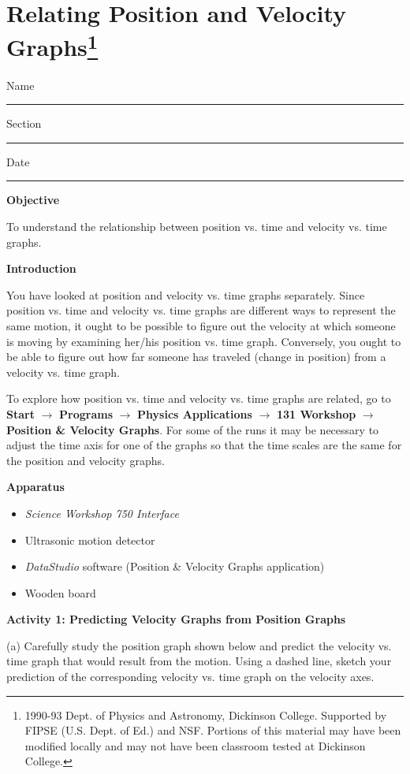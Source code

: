 
\section{Relating Position and Velocity Graphs\footnote{
1990-93 Dept. of Physics and Astronomy, Dickinson College. Supported by FIPSE
(U.S. Dept. of Ed.) and NSF. Portions of this material may have been modified
locally and may not have been classroom tested at Dickinson College.
}}

Name \rule{2.0in}{0.1pt}\hfill{}Section \rule{1.0in}{0.1pt}\hfill{}Date \rule{1.0in}{0.1pt}

\textbf{Objective }

To understand the relationship between position vs. time and velocity vs. time
graphs.

\textbf{Introduction} 

You have looked at position and velocity vs. time graphs separately. Since position
vs. time and velocity vs. time graphs are different ways to represent the same
motion, it ought to be possible to figure out the velocity at which someone
is moving by examining her/his position vs. time graph. Conversely, you ought
to be able to figure out how far someone has traveled (change in position) from
a velocity vs. time graph.

To explore how position vs. time and velocity vs. time graphs are related, go to \textbf{Start} $\rightarrow$ \textbf{Programs} $\rightarrow$ \textbf{Physics Applications} $\rightarrow$ \textbf{131 Workshop} $\rightarrow$ \textbf{Position \& Velocity Graphs}. For some of the runs it may be necessary to adjust the time axis for one of the graphs so that the time scales are the same for the position and velocity graphs.

\vspace{5mm}

\textbf{Apparatus} 

\begin{itemize}
\item \textit{Science Workshop 750 Interface}
\item Ultrasonic motion detector 
\item \textit{DataStudio} software (Position \& Velocity Graphs application)
\item Wooden board
\end{itemize}
\textbf{Activity 1: Predicting Velocity Graphs from Position Graphs} 

(a) Carefully study the position graph shown below and predict the velocity
vs. time graph that would result from the motion. Using a dashed line, sketch
your prediction of the corresponding velocity vs. time graph on the velocity
axes.

